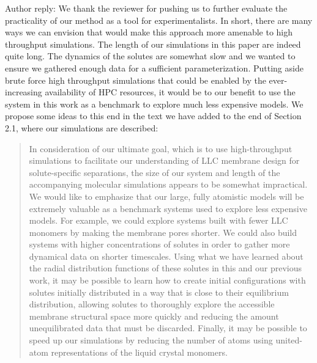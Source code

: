 \documentclass{article}
\begin{document}
\begin{enumerate}[label={Comment \theenumi :}, leftmargin=3.9\parindent]
    Author reply: We thank the reviewer for pushing us to further evaluate the practicality of our
    method as a tool for experimentalists. In short, there are many ways we can envision that 
    would make this approach more amenable to high throughput simulations. The length of our 
    simulations in this paper are indeed quite long. The dynamics of the solutes are somewhat 
    slow and we wanted to ensure we gathered enough data for a sufficient parameterization. 
    Putting aside brute force high throughput simulations that could be enabled by the 
    ever-increasing availability of HPC resources, it would be to our benefit to use the system
    in this work as a benchmark to explore much less expensive models.
    We propose some ideas to this end in the text we have added to the end of Section 2.1, where
    our simulations are described:
    \begin{quote}
    In consideration of our ultimate goal, which is to use high-throughput simulations to 
    facilitate our understanding of LLC membrane design for solute-specific separations, the size 
    of our system and length of the accompanying molecular simulations appears to be somewhat 
    impractical. We would like to emphasize that our large, fully atomistic models will be
    extremely valuable as a benchmark systems used to explore less expensive models. For example, we 
    could explore systems built with fewer LLC monomers by making the membrane pores shorter. We 
    could also build systems with higher concentrations of solutes in order to gather more 
    dynamical data on shorter timescales. Using what we have learned about the radial distribution
    functions of these solutes in this and our previous work\cite{}, it may be possible to 
    learn how to create initial configurations with solutes initially distributed in a way that
    is close to their equilibrium distribution, allowing solutes to thoroughly explore the 
    accessible membrane structural space more quickly and reducing the amount unequilibrated
    data that must be discarded. %
    Finally, it may be possible to speed up our simulations by 
    reducing the number of atoms using united-atom representations of the liquid crystal monomers.
    

\end{quote}
\end{enumerate}
\end{document}
